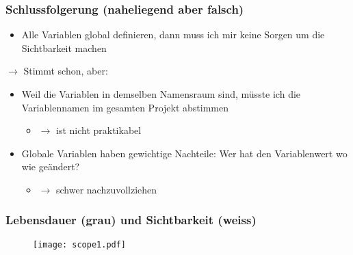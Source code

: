 \subsubsection{Schlussfolgerung (naheliegend aber falsch)\hfill}
\label{sec:Schlussfolgerung (naheliegend aber falsch)}
\begin{itemize}
	\item Alle Variablen global definieren, dann muss ich mir keine Sorgen um die Sichtbarkeit machen
\end{itemize}
$\rightarrow$ Stimmt schon, aber:
\begin{itemize}
	\item Weil die Variablen in demselben Namensraum sind, müsste ich die Variablennamen im gesamten Projekt abstimmen
	\begin{itemize}
		\item[\-] $\rightarrow$ ist nicht praktikabel
	\end{itemize}
	\item Globale Variablen haben gewichtige Nachteile: Wer hat den Variablenwert wo wie geändert?
	\begin{itemize}
		\item[\-] $\rightarrow$ schwer nachzuvollziehen
	\end{itemize}
\end{itemize}

\subsubsection{Lebensdauer (grau) und Sichtbarkeit (weiss)}
\label{sec:Lebensdauer (grau) und Sichtbarkeit (weiss)}
\noindent
\begin{figure}[hh]
	\centering
	\texttt{[image: scope1.pdf]}
\end{figure}

